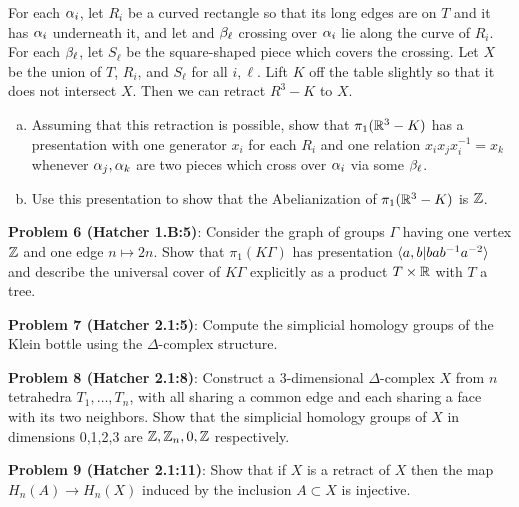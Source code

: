 \documentclass{amsart}
\begin{document}
For each $\alpha_i$, let $R_i$ be a curved rectangle so that its long edges are on $T$ and it has $\alpha_i$ underneath it, and let and $\beta_{\ell}$ crossing over $\alpha_i$ lie along the curve of $R_i$. For each $\beta_{\ell}$, let $S_{\ell}$ be the square-shaped piece which covers the crossing. Let $X$ be the union of $T$, $R_i$, and $S_{\ell}$ for all $i,\ell$. Lift $K$ off the table slightly so that it does not intersect $X$. Then we can retract $R^3-K$ to $X$.\\

\begin{enumerate}[(a)]
	\item Assuming that this retraction is possible, show that $\pi_1(\mathbb{R}^3-K)$ has a presentation with one generator $x_i$ for each $R_i$ and one relation $x_ix_jx_i^{-1}=x_k$ whenever $\alpha_j,\alpha_k$ are two pieces which cross over $\alpha_i$ via some $\beta_{\ell}$.
	\item Use this presentation to show that the Abelianization of $\pi_1(\mathbb{R}^3-K)$ is $\mathbb{Z}$.
\end{enumerate}

\newpage
\textbf{Problem 6 (Hatcher 1.B:5)}: Consider the graph of groups $\Gamma$ having one vertex $\mathbb{Z}$ and one edge $n\mapsto 2n$. Show that $\pi_1(K\Gamma)$ has presentation $\langle a,b|bab^{-1}a^{-2}\rangle$ and describe the universal cover of $K\Gamma$ explicitly as a product $T\times \mathbb{R}$ with $T$ a tree.

\newpage
\textbf{Problem 7 (Hatcher 2.1:5)}: Compute the simplicial homology groups of the Klein bottle using the $\Delta$-complex structure.

\newpage
\textbf{Problem 8 (Hatcher 2.1:8)}: Construct a 3-dimensional $\Delta$-complex $X$ from $n$ tetrahedra $T_1,\dots,T_n$, with all sharing a common edge and each sharing a face with its two neighbors. Show that the simplicial homology groups of $X$ in dimensions 0,1,2,3 are $\mathbb{Z},\mathbb{Z}_n,0,\mathbb{Z}$ respectively.

\newpage 
\textbf{Problem 9 (Hatcher 2.1:11)}: Show that if $X$ is a retract of $X$ then the map $H_n(A)\to H_n(X)$ induced by the inclusion $A\subset X$ is injective.
\end{document}

